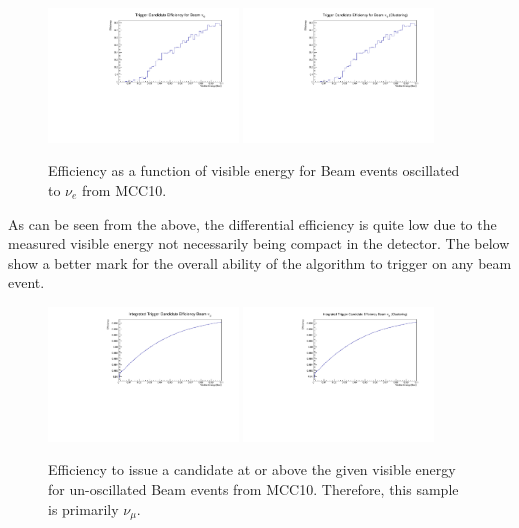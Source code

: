 \documentclass[11pt]{article}
\begin{document}
\begin{figure}[H]
    \centering
    \includegraphics[angle=270,width=0.45\textwidth]{UpdatedEff/Differential_Nu_e_Efficiency_MCC10.pdf}
    \includegraphics[angle=270,width=0.45\textwidth]{UpdatedEff/Differential_Nu_e_Efficiency_MCC10_CLUS.pdf}
    \caption{Efficiency as a function of visible energy for Beam events oscillated to $\nu_{e}$ from MCC10.}
    \label{fig:eff_beam_nue}
\end{figure}

As can be seen from the above, the differential efficiency is quite low due to the measured visible energy not necessarily being compact in the detector. The below show a better mark for the overall ability of the algorithm to trigger on any beam event.

\begin{figure}[H]
    \centering
    \includegraphics[angle=270,width=0.45\textwidth]{UpdatedEff/Integrated_Nu_mu_Efficiency_MCC10.pdf}
    \includegraphics[angle=270,width=0.45\textwidth]{UpdatedEff/Integrated_Nu_mu_Efficiency_MCC10_CLUS.pdf}
    \caption{Efficiency to issue a candidate at or above the given visible energy for un-oscillated Beam events from MCC10. Therefore, this sample is primarily $\nu_{\mu}$.}
    \label{fig:eff_beam_numu_int}
\end{figure}
\end{document}
